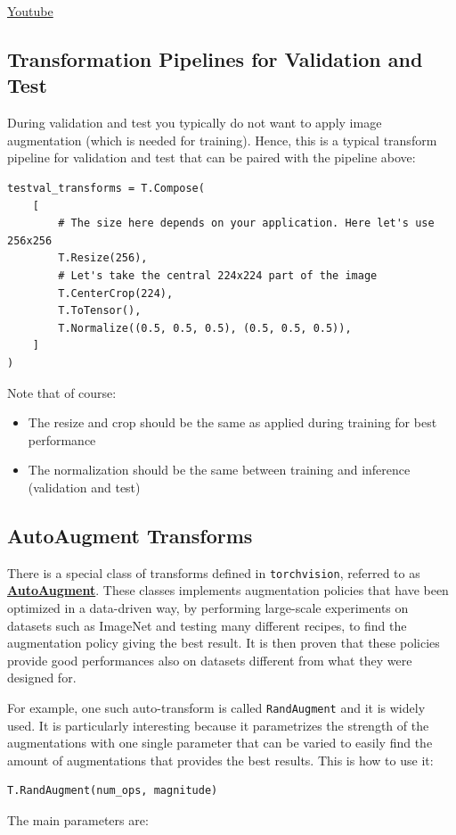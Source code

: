 \href{https://www.youtube.com/watch?v=SeStXrarAtQ&ab_channel=Udacity}{Youtube}

\subsection{Transformation Pipelines for Validation and Test}

During validation and test you typically do not want to apply image augmentation (which is needed for training). Hence, this is a typical transform pipeline for validation and test that can be paired with the pipeline above:
\begin{lstlisting}
testval_transforms = T.Compose(
    [
        # The size here depends on your application. Here let's use 256x256
        T.Resize(256),
        # Let's take the central 224x224 part of the image
        T.CenterCrop(224),
        T.ToTensor(),
        T.Normalize((0.5, 0.5, 0.5), (0.5, 0.5, 0.5)),
    ]
)
\end{lstlisting}
Note that of course:

\begin{itemize}
    \item The resize and crop should be the same as applied during training for best performance
    \item The normalization should be the same between training and inference (validation and test)
\end{itemize}

\subsection{AutoAugment Transforms}

There is a special class of transforms defined in \lstinline{torchvision}, referred to as \href{https://pytorch.org/vision/main/transforms.html\#automatic-augmentation-transforms}{\textbf{AutoAugment}}. These classes implements augmentation policies that have been optimized in a data-driven way, by performing large-scale experiments on datasets such as ImageNet and testing many different recipes, to find the augmentation policy giving the best result. It is then proven that these policies provide good performances also on datasets different from what they were designed for. \newline

For example, one such auto-transform is called \lstinline{RandAugment} and it is widely used. It is particularly interesting because it parametrizes the strength of the augmentations with one single parameter that can be varied to easily find the amount of augmentations that provides the best results. This is how to use it:
\begin{lstlisting}
T.RandAugment(num_ops, magnitude)
\end{lstlisting}
The main parameters are:

